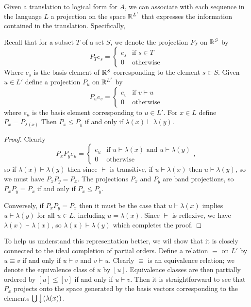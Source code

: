 \documentclass[12pt]{report}
\begin{document}
Given a translation to logical form for $A$, we can associate with each sequence in the language $L$ a projection on the space $\mathbb{R}^{L'}$ that expresses the information contained in the translation. Specifically,
\begin{prop}
Recall that for a subset $T$ of a set $S$, we denote the projection $P_T$ on $\mathbb{R}^S$ by 
$$P_T e_s = \left\{
\begin{array}{ll}
e_s & \text{if $s \in T$}\\
0 & \text{otherwise}
\end{array}
 \right.$$
 Where $e_s$ is the basis element of $\mathbb{R}^S$ corresponding to the element $s\in S$.
Given $u \in L'$ define a projection $P_u$ on $\mathbb{R}^{L'}$ by
$$P_u e_v = \left\{
\begin{array}{ll}
e_v & \text{if $v \vdash u$}\\
0 & \text{otherwise}
\end{array}
 \right.$$
 where $e_u$ is the basis element corresponding to $u \in L'$. For $x \in L$ define $P_x = P_{\lambda(x)}$ Then $P_x \le P_y$ if and only if $\lambda(x) \vdash \lambda(y)$.
\end{prop}
\begin{proof}
Clearly
$$P_xP_y e_u = \left\{
\begin{array}{ll}
e_u & \text{if $u \vdash \lambda(x)$ and $u \vdash \lambda(y)$}\\
0 & \text{otherwise}
\end{array},
 \right.$$
so if $\lambda(x) \vdash \lambda(y)$ then since $\vdash$ is transitive, if $u \vdash \lambda(x)$ then $u \vdash \lambda(y)$, so we must have $P_xP_y = P_x$. The projections $P_x$ and $P_y$ are band projections, so $P_xP_y = P_x$ if and only if $P_x \le P_y$.

Conversely, if $P_xP_y = P_x$ then it must be the case that $u \vdash \lambda(x)$ implies $u \vdash \lambda(y)$ for all $u \in L$, including $u = \lambda(x)$. Since $\vdash$ is reflexive, we have $\lambda(x) \vdash \lambda(x)$, so $\lambda(x) \vdash \lambda(y)$ which completes the proof.
\end{proof}

To help us understand this representation better, we wil show that it is closely connected to the ideal completion of partial orders. Define a relation $\equiv$ on $L'$ by $u \equiv v$ if and only if $u \vdash v$ and $v \vdash u$. Clearly $\equiv$ is an equivalence relation; we denote the equivalence class of $u$ by $[u]$. Equivalence classes are then partially ordered by $[u] \le [v]$ if and only if $u \vdash v$. Then it is straightforward to see that $P_x$ projects onto the space generated by the basis vectors corresponding to the elements $\bigcup \left\downarrow(\lambda(x))\right.$.
\end{document}
